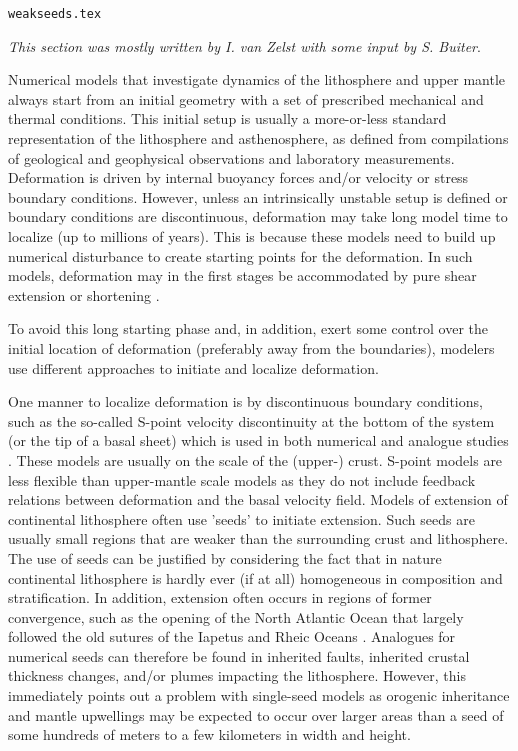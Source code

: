 \begin{flushright} {\tiny {\color{gray} \tt weakseeds.tex}} \end{flushright}

{\sl This section was mostly written by I. van Zelst with some input by S. Buiter}. 

Numerical models that investigate dynamics of the lithosphere and upper mantle always
start from an initial geometry with a set of prescribed mechanical and thermal conditions. 
This initial setup is usually a more-or-less standard representation of the
lithosphere and asthenosphere, as defined from compilations of geological and geophysical 
observations and laboratory measurements. Deformation is driven by internal buoyancy
forces and/or velocity or stress boundary conditions. However, unless an 
intrinsically unstable setup is defined or boundary conditions are discontinuous, 
deformation may take long model time to localize (up to millions of years). 
This is because these models need to build up numerical disturbance to create starting 
points for the deformation. In such models, deformation may in the first stages be
accommodated by pure shear extension or shortening \cite{pybf00,moql07}. 

To avoid this long starting phase and, in addition, exert some control 
over the initial location of deformation (preferably away from the boundaries), modelers 
use different approaches to initiate and localize deformation.

One manner to localize deformation is by discontinuous boundary conditions, such 
as the so-called S-point velocity discontinuity at the bottom of the system 
(or the tip of a basal sheet) which is used in both numerical 
\cite{brbe95,elfb95,will99a,bemh00,bube06,thfb08,brya10}
and analogue studies \cite{bube06,mime00}.
These models are usually on the scale of the (upper-) crust. 
S-point models are less flexible than upper-mantle scale models as they do not include
feedback relations between deformation and the basal velocity field.
Models of extension of continental lithosphere often use 'seeds' to initiate
extension. Such seeds are usually small regions that are weaker than the surrounding crust
and lithosphere. The use of seeds can be justified by considering the fact that in
nature continental lithosphere is hardly ever (if at all) homogeneous in composition 
and stratification. In addition, extension often occurs in regions of former
convergence, such as the opening of the North Atlantic Ocean that largely followed the old 
sutures of the Iapetus and Rheic Oceans \cite{wils66}. Analogues for numerical seeds 
can therefore be found in inherited faults, inherited crustal thickness changes, and/or 
plumes impacting the lithosphere. However, this immediately points out a problem with 
single-seed models as orogenic inheritance and mantle upwellings may be expected to 
occur over larger areas than a seed of some hundreds of meters to a few kilometers 
in width and height.

